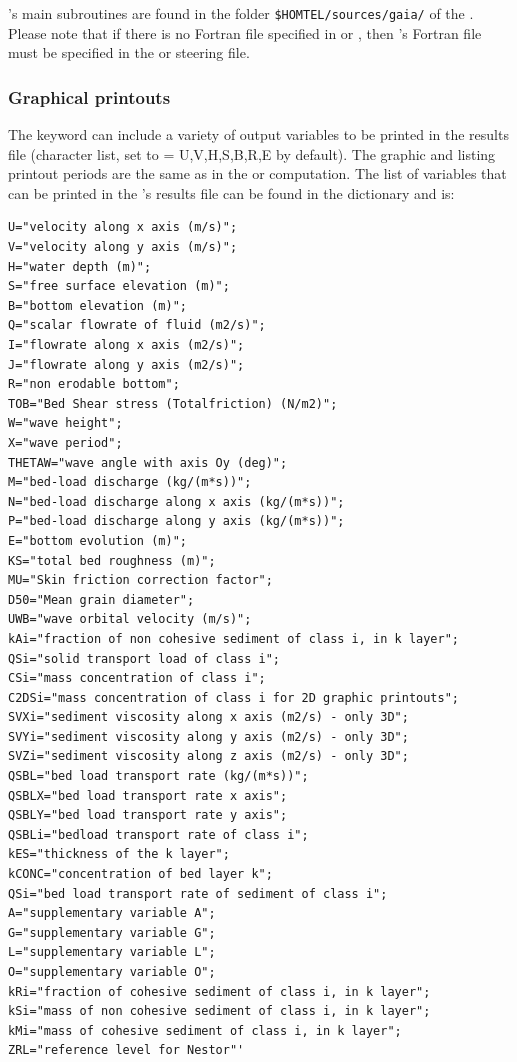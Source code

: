 \gaia{}'s main subroutines are found in the folder \texttt{\$HOMTEL/sources/gaia/} of the \telemacsystem{}. Please note that if there is no Fortran file specified in  or , then \gaia's Fortran file must be specified in the  or  steering file.

\pagebreak

\subsubsection{Graphical printouts}
The keyword  can include a variety of output variables to be printed in the results file (character list, set to {\ttfamily = U,V,H,S,B,R,E} by default). The graphic and listing printout periods are the same as in the  or  computation. The list of variables that can be printed in the \gaia{}'s results file can be found in the dictionary and is:
\begin{lstlisting}[frame=trBL]
U="velocity along x axis (m/s)";
V="velocity along y axis (m/s)";
H="water depth (m)";
S="free surface elevation (m)";
B="bottom elevation (m)";
Q="scalar flowrate of fluid (m2/s)";
I="flowrate along x axis (m2/s)";
J="flowrate along y axis (m2/s)";
R="non erodable bottom";
TOB="Bed Shear stress (Totalfriction) (N/m2)";
W="wave height";
X="wave period";
THETAW="wave angle with axis Oy (deg)";
M="bed-load discharge (kg/(m*s))";
N="bed-load discharge along x axis (kg/(m*s))";
P="bed-load discharge along y axis (kg/(m*s))";
E="bottom evolution (m)";
KS="total bed roughness (m)";
MU="Skin friction correction factor";
D50="Mean grain diameter";
UWB="wave orbital velocity (m/s)";
kAi="fraction of non cohesive sediment of class i, in k layer";
QSi="solid transport load of class i";
CSi="mass concentration of class i";
C2DSi="mass concentration of class i for 2D graphic printouts";
SVXi="sediment viscosity along x axis (m2/s) - only 3D";
SVYi="sediment viscosity along y axis (m2/s) - only 3D";
SVZi="sediment viscosity along z axis (m2/s) - only 3D";
QSBL="bed load transport rate (kg/(m*s))";
QSBLX="bed load transport rate x axis";
QSBLY="bed load transport rate y axis";
QSBLi="bedload transport rate of class i";
kES="thickness of the k layer";
kCONC="concentration of bed layer k";
QSi="bed load transport rate of sediment of class i";
A="supplementary variable A";
G="supplementary variable G";
L="supplementary variable L";
O="supplementary variable O";
kRi="fraction of cohesive sediment of class i, in k layer";
kSi="mass of non cohesive sediment of class i, in k layer";
kMi="mass of cohesive sediment of class i, in k layer";
ZRL="reference level for Nestor"'

\end{lstlisting}

